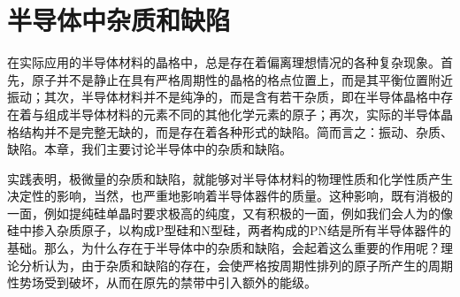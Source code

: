 \chapter{半导体中杂质和缺陷}
在实际应用的半导体材料的晶格中，总是存在着偏离理想情况的各种复杂现象。首先，原子并不是静止在具有严格周期性的晶格的格点位置上，而是其平衡位置附近振动；其次，半导体材料并不是纯净的，而是含有若干杂质，即在半导体晶格中存在着与组成半导体材料的元素不同的其他化学元素的原子；再次，实际的半导体晶格结构并不是完整无缺的，而是存在着各种形式的缺陷。简而言之：振动、杂质、缺陷。本章，我们主要讨论半导体中的杂质和缺陷。

实践表明，极微量的杂质和缺陷，就能够对半导体材料的物理性质和化学性质产生决定性的影响，当然，也严重地影响着半导体器件的质量。这种影响，既有消极的一面，例如提纯硅单晶时要求极高的纯度，又有积极的一面，例如我们会人为的像硅中掺入杂质原子，以构成P型硅和N型硅，两者构成的PN结是所有半导体器件的基础。那么，为什么存在于半导体中的杂质和缺陷，会起着这么重要的作用呢？理论分析认为，由于杂质和缺陷的存在，会使严格按周期性排列的原子所产生的周期性势场受到破坏，从而在原先的禁带中引入额外的能级。


